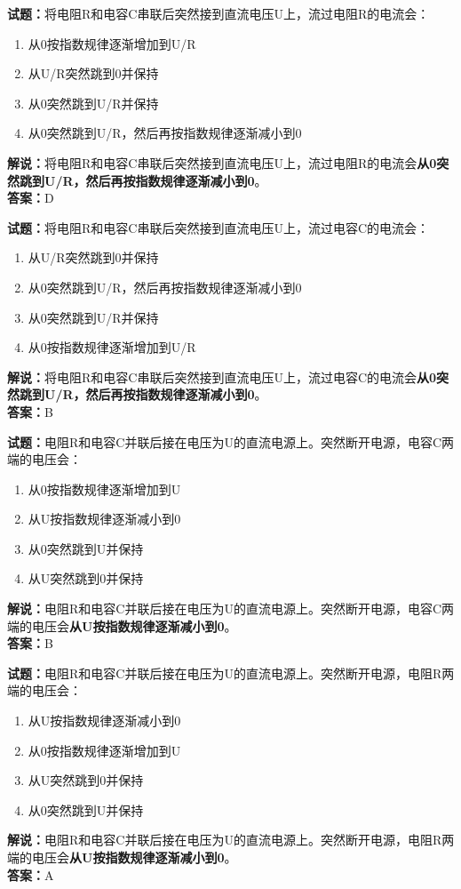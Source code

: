 \documentclass{ctexbook}
\begin{document}
\bigskip


\noindent\textbf{试题：}将电阻R和电容C串联后突然接到直流电压U上，流过电阻R的电流会：
\begin{enumerate}[leftmargin=3em]
\item 从0按指数规律逐渐增加到U/R
\item 从U/R突然跳到0并保持
\item 从0突然跳到U/R并保持
\item 从0突然跳到U/R，然后再按指数规律逐渐减小到0
\end{enumerate}
\noindent\textbf{解说：}将电阻R和电容C串联后突然接到直流电压U上，流过电阻R的电流会\textbf{从0突然跳到U/R，然后再按指数规律逐渐减小到0}。\\\noindent\textbf{答案：}D


\bigskip


\noindent\textbf{试题：}将电阻R和电容C串联后突然接到直流电压U上，流过电容C的电流会：
\begin{enumerate}[leftmargin=3em]
\item 从U/R突然跳到0并保持
\item 从0突然跳到U/R，然后再按指数规律逐渐减小到0
\item 从0突然跳到U/R并保持
\item 从0按指数规律逐渐增加到U/R
\end{enumerate}
\noindent\textbf{解说：}将电阻R和电容C串联后突然接到直流电压U上，流过电容C的电流会\textbf{从0突然跳到U/R，然后再按指数规律逐渐减小到0}。\\\noindent\textbf{答案：}B



\bigskip


\noindent\textbf{试题：}电阻R和电容C并联后接在电压为U的直流电源上。突然断开电源，电容C两端的电压会：
\begin{enumerate}[leftmargin=3em]
\item 从0按指数规律逐渐增加到U
\item 从U按指数规律逐渐减小到0
\item 从0突然跳到U并保持
\item 从U突然跳到0并保持
\end{enumerate}
\noindent\textbf{解说：}电阻R和电容C并联后接在电压为U的直流电源上。突然断开电源，电容C两端的电压会\textbf{从U按指数规律逐渐减小到0}。\\\noindent\textbf{答案：}B



\bigskip


\noindent\textbf{试题：}电阻R和电容C并联后接在电压为U的直流电源上。突然断开电源，电阻R两端的电压会：
\begin{enumerate}[leftmargin=3em]
\item 从U按指数规律逐渐减小到0
\item 从0按指数规律逐渐增加到U
\item 从U突然跳到0并保持
\item 从0突然跳到U并保持
\end{enumerate}
\noindent\textbf{解说：}电阻R和电容C并联后接在电压为U的直流电源上。突然断开电源，电阻R两端的电压会\textbf{从U按指数规律逐渐减小到0}。\\\noindent\textbf{答案：}A
\end{document}
